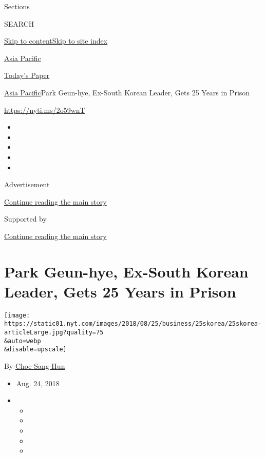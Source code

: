 Sections

SEARCH

\protect\hyperlink{site-content}{Skip to
content}\protect\hyperlink{site-index}{Skip to site index}

\href{https://www.nytimes.com/section/world/asia}{Asia Pacific}

\href{https://myaccount.nytimes.com/auth/login?response_type=cookie\&client_id=vi}{}

\href{https://www.nytimes.com/section/todayspaper}{Today's Paper}

\href{/section/world/asia}{Asia Pacific}\textbar{}Park Geun-hye,
Ex-South Korean Leader, Gets 25 Years in Prison

\url{https://nyti.ms/2o59wnT}

\begin{itemize}
\item
\item
\item
\item
\item
\end{itemize}

Advertisement

\protect\hyperlink{after-top}{Continue reading the main story}

Supported by

\protect\hyperlink{after-sponsor}{Continue reading the main story}

\hypertarget{park-geun-hye-ex-south-korean-leader-gets-25-years-in-prison}{%
\section{Park Geun-hye, Ex-South Korean Leader, Gets 25 Years in
Prison}\label{park-geun-hye-ex-south-korean-leader-gets-25-years-in-prison}}

\texttt{[image: https://static01.nyt.com/images/2018/08/25/business/25skorea/25skorea-articleLarge.jpg?quality=75\\\&auto=webp\\\&disable=upscale]}

By \href{http://www.nytimes.com/by/choe-sang-hun}{Choe Sang-Hun}

\begin{itemize}
\item
  Aug. 24, 2018
\item
  \begin{itemize}
  \item
  \item
  \item
  \item
  \item
  \end{itemize}
\end{itemize}

